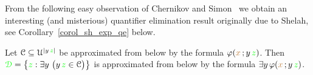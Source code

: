 \documentclass[creche.tex]{subfiles}
\begin{document}
From the following easy observation of Chernikov and Simon~\cite{CS} we obtain an interesting (and misterious) quantifier elimination result originally due to Shelah, see Corollary~\ref{corol_sh_exp_qe} below.

% 
% 
% 
% 
% 
% 
% 
% 
% 

\begin{proposition}\label{prop_sh_exp_qe}
Let $\EuScript C\subseteq\EuScript U^{|y\,{\color{green} z}|}$ be approximated from below by the formula $\varphi({\color{brown} x}\,;y\,{\color{green} z})$.
Then ${\color{green}\EuScript D}=\big\{{\color{green} z}:\exists y\ \big(y\,{\color{green} z}\in\EuScript C\big)\big\}$ is approximated from below by the formula $\exists y\,\varphi({\color{brown} x}\,;y\,{\color{green} z})$.
\end{proposition}
\end{document}
